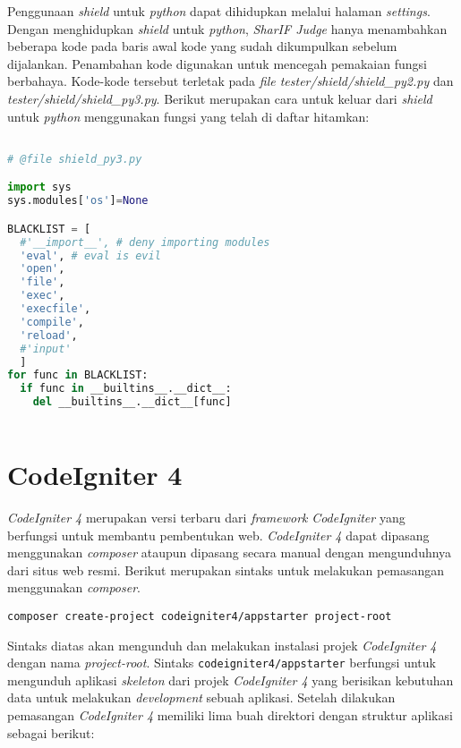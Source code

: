 Penggunaan \textit{shield} untuk \textit{python} dapat dihidupkan melalui halaman \textit{settings}. Dengan menghidupkan \textit{shield} untuk \textit{python}, \textit{SharIF Judge} hanya menambahkan beberapa kode pada baris awal kode yang sudah dikumpulkan sebelum dijalankan. Penambahan kode digunakan untuk mencegah pemakaian fungsi berbahaya. Kode-kode tersebut terletak pada \textit{file tester/shield/shield\_py2.py} dan \textit{tester/shield/shield\_py3.py}. Berikut merupakan cara untuk keluar dari \textit{shield} untuk \textit{python} menggunakan fungsi yang telah di daftar hitamkan:

\begin{lstlisting}[language=Python,caption=Cara keluar dari \textit{shield} untuk \textit{python},label=kode:pythonshield]

# @file shield_py3.py

import sys
sys.modules['os']=None

BLACKLIST = [
  #'__import__', # deny importing modules
  'eval', # eval is evil
  'open',
  'file',
  'exec',
  'execfile',
  'compile',
  'reload',
  #'input'
  ]
for func in BLACKLIST:
  if func in __builtins__.__dict__:
    del __builtins__.__dict__[func]
    
\end{lstlisting}

\section{CodeIgniter 4\cite{codeigniter:23:ci4}}
\label{sec:ci4}

\textit{CodeIgniter 4} merupakan versi terbaru dari \textit{framework} \textit{CodeIgniter} yang berfungsi untuk membantu pembentukan web. \textit{CodeIgniter 4} dapat dipasang menggunakan \textit{composer} ataupun dipasang secara manual dengan mengunduhnya dari situs web resmi. Berikut merupakan sintaks untuk melakukan pemasangan menggunakan \textit{composer}.

\begin{center}
\verb|composer create-project codeigniter4/appstarter project-root|
\end{center}

Sintaks diatas akan mengunduh dan melakukan instalasi projek \textit{CodeIgniter 4} dengan nama \textit{project-root}. Sintaks \texttt{codeigniter4/appstarter} berfungsi untuk mengunduh aplikasi \textit{skeleton} dari projek \textit{CodeIgniter 4} yang berisikan kebutuhan data untuk melakukan \textit{development} sebuah aplikasi. Setelah dilakukan pemasangan \textit{CodeIgniter 4} memiliki lima buah direktori dengan struktur aplikasi sebagai berikut:

